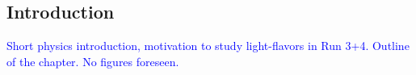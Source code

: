 \subsection{Introduction}
\textcolor{blue}{Short physics introduction, motivation to study light-flavors in Run 3+4. Outline of the chapter. No figures foreseen.}

